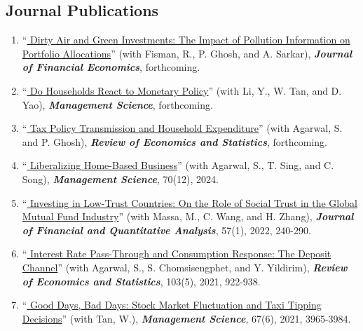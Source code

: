 \documentclass[margin,line]{res}
\begin{document}
\begin{resume}
\section{\sc Journal Publications}
\begin{enumerate}

\item ``\href{https://www.nber.org/papers/w31813}{\color{black} Dirty Air and Green Investments: The Impact of Pollution Information on Portfolio Allocations}'' (with Fisman, R., P. Ghosh, and A. Sarkar), \textbf{\emph{Journal of Financial Economics}}, forthcoming.
\vspace*{0.2cm} 	
\item ``\href{https://doi.org/10.1287/mnsc.2024.04649}{\color{black} Do Households React to Monetary Policy}'' (with Li, Y., W. Tan, and D. Yao), \textbf{\emph{Management Science}}, forthcoming.
	\vspace*{0.2cm}
\item ``\href{https://doi.org/10.1162/rest_a_01584}{\color{black} Tax Policy Transmission and Household Expenditure}'' (with Agarwal, S. and P. Ghosh), \textbf{\emph{Review of Economics and Statistics}}, forthcoming.
	\vspace*{0.2cm}
\item ``\href{https://doi.org/10.1287/mnsc.2021.04232}{\color{black} Liberalizing Home-Based Business}'' (with Agarwal, S., T. Sing, and C. Song), \textbf{\emph{Management Science}}, 70(12), 2024.
	\vspace*{0.2cm}
\item ``\href{https://jfqa.org/2020/04/28/investing-in-low-trust-countries-on-the-role-of-social-trust-in-the-global-mutual-fund-industry/}{\color{black} Investing in Low-Trust Countries: On the Role of Social Trust in the Global Mutual Fund Industry}'' (with Massa, M., C. Wang, and H. Zhang), \textbf{\emph{Journal of Financial and Quantitative Analysis}}, 57(1), 2022, 240-290.
	\vspace*{0.2cm}
\item ``\href{https://www.mitpressjournals.org/doi/abs/10.1162/rest_a_00941?mobileUi=0}{\color{black} Interest Rate Pass-Through and Consumption Response: The Deposit Channel}'' (with Agarwal, S., S. Chomsisengphet, and Y. Yildirim), \textbf{\emph{Review of Economics and Statistics}}, 103(5), 2021, 922-938.
\vspace*{0.2cm}	
\item %
 ``\href{https://pubsonline.informs.org/doi/10.1287/mnsc.2019.3557}{\color{black} Good Days, Bad Days: Stock Market Fluctuation and Taxi Tipping Decisions}'' (with Tan, W.), \textbf{\emph{Management Science}}, 67(6), 2021, 3965-3984.
\vspace*{0.2cm}



\end{enumerate}
\end{resume}
\end{document}

